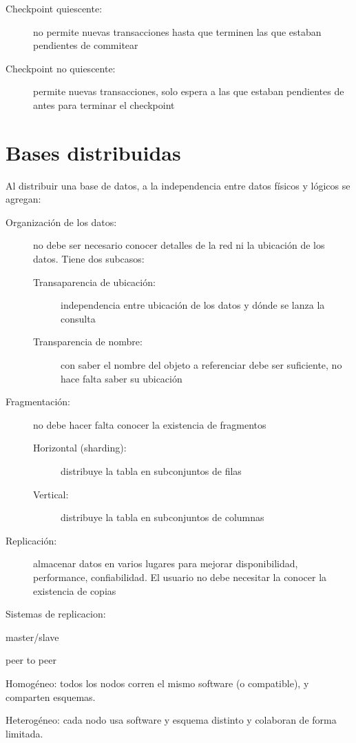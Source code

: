 \begin{description}
	\item[Checkpoint quiescente:] no permite nuevas transacciones hasta que terminen las que estaban pendientes de commitear
	\item[Checkpoint no quiescente:] permite nuevas transacciones, solo espera a las que estaban pendientes de antes para terminar el checkpoint
\end{description}

\section{Bases distribuidas}

Al distribuir una base de datos, a la independencia entre datos físicos y lógicos se agregan:

\begin{description}
	\item[Organización de los datos:] no debe ser necesario conocer detalles de la red ni la ubicación de los datos. Tiene dos subcasos:
	\begin{description}
		\item[Transaparencia de ubicación:] independencia entre ubicación de los datos y dónde se lanza la consulta
		\item[Transparencia de nombre:] con saber el nombre del objeto a referenciar debe ser suficiente, no hace falta saber su ubicación
	\end{description}
	\item[Fragmentación:] no debe hacer falta conocer la existencia de fragmentos
	\begin{description}
		\item[Horizontal (sharding):] distribuye la tabla en subconjuntos de filas
		\item[Vertical:] distribuye la tabla en subconjuntos de columnas
	\end{description}
	\item[Replicación:] almacenar datos en varios lugares para mejorar disponibilidad, performance, confiabilidad. El usuario no debe necesitar la conocer la existencia de copias
\end{description}

Sistemas de replicacion:

master/slave

peer to peer

Homogéneo: todos los nodos corren el mismo software (o compatible), y comparten esquemas.

Heterogéneo: cada nodo usa software y esquema distinto y colaboran de forma limitada.
